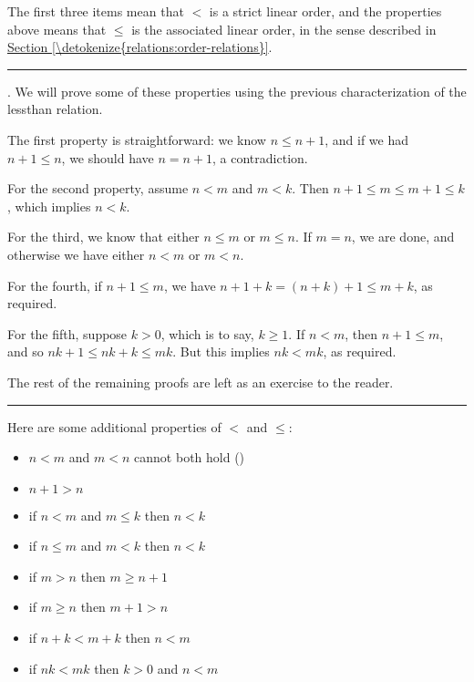 \documentclass[letterpaper,10pt,english]{sphinxmanual}
\begin{document}
\sphinxAtStartPar
The first three items mean that \(<\) is a strict linear order, and the properties above means that \(\le\) is the associated linear order, in the sense described in \hyperref[\detokenize{relations:order-relations}]{Section \ref{\detokenize{relations:order-relations}}}.


\bigskip\hrule\bigskip


\sphinxAtStartPar
{}. We will prove some of these properties using the previous characterization of the less\sphinxhyphen{}than relation.

\sphinxAtStartPar
The first property is straightforward: we know \(n \le n + 1\), and if we had \(n + 1 \le n\), we should have \(n = n + 1\), a contradiction.

\sphinxAtStartPar
For the second property, assume \(n < m\) and \(m < k\). Then \(n + 1 \le m \le m + 1 \le k\), which implies \(n < k\).

\sphinxAtStartPar
For the third, we know that either \(n \le m\) or \(m \le n\). If \(m = n\), we are done, and otherwise we have either \(n < m\) or \(m < n\).

\sphinxAtStartPar
For the fourth, if \(n + 1 \le m\), we have \(n + 1 + k = (n + k) + 1 \le m + k\), as required.

\sphinxAtStartPar
For the fifth, suppose \(k > 0\), which is to say, \(k \ge 1\). If \(n < m\), then \(n + 1 \le m\), and so \(nk + 1 \le n k + k \le mk\). But this implies \(n k < m k\), as required.

\sphinxAtStartPar
The rest of the remaining proofs are left as an exercise to the reader.


\bigskip\hrule\bigskip


\sphinxAtStartPar
Here are some additional properties of \(<\) and \(\le\):
\begin{itemize}
\item {} 
\sphinxAtStartPar
\(n < m\) and \(m < n\) cannot both hold ()

\item {} 
\sphinxAtStartPar
\(n + 1 > n\)

\item {} 
\sphinxAtStartPar
if \(n < m\) and \(m \le k\) then \(n < k\)

\item {} 
\sphinxAtStartPar
if \(n \le m\) and \(m < k\) then \(n < k\)

\item {} 
\sphinxAtStartPar
if \(m > n\) then \(m \ge n + 1\)

\item {} 
\sphinxAtStartPar
if \(m \ge n\) then \(m + 1 > n\)

\item {} 
\sphinxAtStartPar
if \(n + k < m + k\) then \(n < m\)

\item {} 
\sphinxAtStartPar
if \(nk < mk\) then \(k > 0\) and \(n < m\)

\end{itemize}
\end{document}
